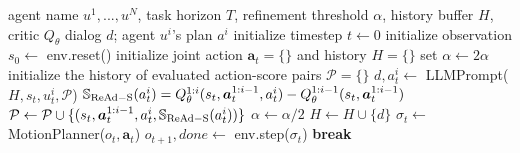 \documentclass[11pt]{article}
\theoremstyle{plain}
\theoremstyle{remark}
\begin{document}
\begin{algorithm}[h!]
   \caption{\emph{ReAd-S}: Reinforced Advantage Feedback with Sequential Individual Plan Refinement}
   \label{alg:llm_planning_sequential}
\begin{algorithmic}
    agent name $u^1, ..., u^N$, task horizon $T$, refinement threshold $\alpha$, history buffer $H$, critic $Q_\theta$
    dialog $d$; agent $u^i$'s plan $a^i$
   \STATE initialize timestep $t \leftarrow 0$
   \STATE initialize observation $s_0 \leftarrow$ env$.$reset()
   \STATE initialize joint action $\boldsymbol{a}_t = \{\}$ and history $H=\{\}$
   \STATE set $\alpha \leftarrow 2\alpha$
   {\color{brown}
   \STATE initialize the history of evaluated action-score pairs $\mathcal{P} = \{\}$
   \REPEAT
   \STATE $d, a_t^i \leftarrow$ LLMPrompt($H, s_t, u_t^i, \mathcal{P}$)
   \STATE $\mathbb{S}_{\rm ReAd-S}(a_t^i) = Q_\theta^{1:i}(s_t, \boldsymbol{a}^{1:i-1}_t,a_t^i) - Q_\theta^{1:i-1}(s_t, \boldsymbol{a}^{1:i-1}_t)$
   \STATE $\mathcal{P} \leftarrow \mathcal{P} \cup \{(s_t,\boldsymbol{a}^{1:i-1}_t,a_t^i, \mathbb{S}_{\rm ReAd-S}(a_t^i))\}$
   \STATE $\alpha \leftarrow \alpha/2$
   \STATE 
   $H \leftarrow H \cup \{d\}$
   \ENDFOR
   }
   \STATE $\sigma_t \leftarrow$ MotionPlanner($o_t, \boldsymbol{a}_t$)
   \STATE $o_{t+1}, done \leftarrow$ env$.$step($\sigma_t$)
   \STATE \bfseries break
   \ENDIF
   \ENDWHILE
\end{algorithmic}
\end{algorithm}
\end{document}
